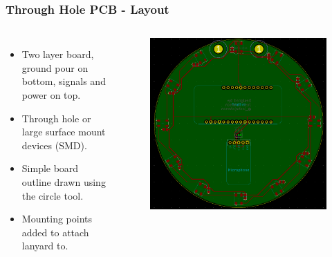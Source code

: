 \documentclass[aspectratio=169, t]{beamer}
\begin{document}
\begin{frame}
\frametitle{Through Hole PCB - Layout}
\vspace{-5mm}
\begin{columns}
	\begin{itemize}
		\item Two layer board, ground pour on bottom, signals and power on top.
		\item Through hole or large surface mount devices (SMD).
		\item Simple board outline drawn using the circle tool.
		\item Mounting points added to attach lanyard to.
	\end{itemize}
	\begin{figure}
		\includegraphics[width=0.9\linewidth]{images/module-layout.png}
	\end{figure}
\end{columns}
\end{frame}
\end{document}
